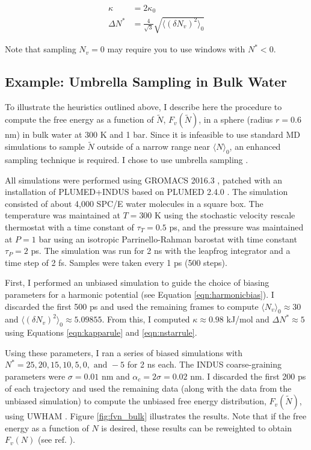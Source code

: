 \documentclass[11pt,notitlepage]{article}
\begin{document}
\begin{align}
	\label{eqn:kapparule}
	\kappa &= 2 \kappa_0  \\
	\label{eqn:nstarrule}
	\Delta N^* &= \frac{4}{\sqrt{3}} \sqrt{ \langle (\delta N_v)^2 \rangle_0 }
\end{align}


Note that sampling $N_v = 0$ may require you to use windows with $N^* < 0$.


\subsection{Example: Umbrella Sampling in Bulk Water}

To illustrate the heuristics outlined above, I describe here the procedure to compute the free energy as a function of $\tilde{N}$, $F_v(\tilde{N})$, in a sphere (radius $r = 0.6$ nm) in bulk water at 300 K and 1 bar. Since it is infeasible to use standard MD simulations to sample $\tilde{N}$ outside of a narrow range near $\langle N \rangle_0$, an enhanced sampling technique is required. I chose to use umbrella sampling \cite{Torrie1977,Patel2010}.

All simulations were performed using GROMACS 2016.3 \cite{VanDerSpoel2005}, patched with an installation of PLUMED+INDUS based on PLUMED 2.4.0 \cite{Tribello2014}. The simulation consisted of about 4,000 SPC/E water molecules \cite{Berendsen1987} in a square box. The temperature was maintained at $T = 300$ K using the stochastic velocity rescale thermostat \cite{Bussi2007} with a time constant of $\tau_T = 0.5$ ps, and the pressure was maintained at $P = 1$ bar using an isotropic Parrinello-Rahman barostat \cite{Parrinello1981} with time constant $\tau_P = 2$ ps. The simulation was run for 2 ns with the leapfrog integrator and a time step of 2 fs. Samples were taken every 1 ps (500 steps).

First, I performed an unbiased simulation to guide the choice of biasing parameters for a harmonic potential (see Equation \ref{eqn:harmonicbias}). I discarded the first 500 ps and used the remaining frames to compute $\langle N_v \rangle_0 \approx 30$ and $\langle (\delta N_v)^2 \rangle_0 \approx 5.09855$. From this, I computed $\kappa \approx 0.98$ kJ/mol and $\Delta N^* \approx 5$ using Equations \ref{eqn:kapparule} and \ref{eqn:nstarrule}. 

Using these parameters, I ran a series of biased simulations with $N^* = 25, 20, 15, 10, 5, 0, \text{ and } -5$ for 2 ns each. The INDUS coarse-graining parameters were $\sigma = 0.01$ nm and $\alpha_c = 2 \sigma = 0.02$ nm. I discarded the first 200 ps of each trajectory and used the remaining data (along with the data from the unbiased simulation) to compute the unbiased free energy distribution, $F_v( \tilde{N} )$, using UWHAM \cite{Tan2012}. Figure \ref{fig:fvn_bulk} illustrates the results. Note that if the free energy as a function of $N$ is desired, these results can be reweighted to obtain $F_v(N)$ (see ref. \cite{Patel2010}).
\end{document}
